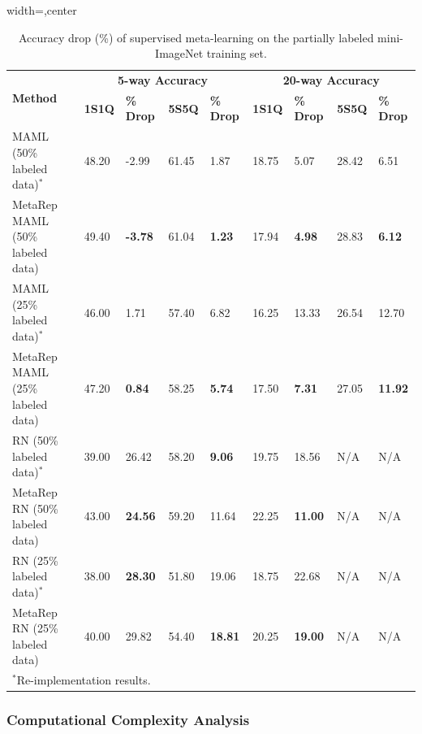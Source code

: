   
\begin{table}[htbp]
    \caption{Accuracy drop (\%) of supervised meta-learning on the partially labeled mini-ImageNet training set.}
    \begin{adjustbox}{width=\linewidth,center}
      \fontsize{9}{9}\selectfont
      \begin{tabular}{p{5cm}llll|llll}
        \toprule
        \multirow{2}{5cm}{\bf Method} 
        & \multicolumn{4}{c|}{\bf 5-way Accuracy} 
        & \multicolumn{4}{c}{\bf 20-way Accuracy} \\
        & {\bf 1S1Q} & {\bf \% Drop} & {\bf 5S5Q} & {\bf \% Drop} 
        & {\bf 1S1Q} & {\bf \% Drop} & {\bf 5S5Q} & {\bf \% Drop} \\
        \midrule
        MAML (50\% labeled data)$^{*}$          & 48.20 & -2.99 & 61.45 & 1.87  & 18.75 & 5.07  & 28.42 & 6.51  \\
        MetaRep MAML (50\% labeled data)        & 49.40 & \textbf{-3.78} & 61.04 & \textbf{1.23}  & 17.94 & \textbf{4.98} & 28.83 & \textbf{6.12} \\
        \midrule
        MAML (25\% labeled data)$^{*}$          & 46.00 & 1.71  & 57.40 & 6.82  & 16.25 & 13.33 & 26.54 & 12.70 \\
        MetaRep MAML (25\% labeled data)        & 47.20 & \textbf{0.84}  & 58.25 & \textbf{5.74}  & 17.50 & \textbf{7.31} & 27.05 & \textbf{11.92} \\
        \midrule
        RN (50\% labeled data)$^{*}$            & 39.00 & 26.42 & 58.20 & \textbf{9.06}   & 19.75 & 18.56 & N/A   & N/A   \\
        MetaRep RN (50\% labeled data)          & 43.00 & \textbf{24.56} & 59.20 & 11.64  & 22.25 & \textbf{11.00} & N/A   & N/A   \\
        \midrule
        RN (25\% labeled data)$^{*}$            & 38.00 & \textbf{28.30} & 51.80 & 19.06  & 18.75 & 22.68 & N/A   & N/A   \\
        MetaRep RN (25\% labeled data)          & 40.00 & 29.82 & 54.40 & \textbf{18.81} & 20.25 & \textbf{19.00} & N/A   & N/A   \\
        \bottomrule
        \multicolumn{9}{l}{$^{*}$Re-implementation results.}
      \end{tabular}
    \end{adjustbox}
    \label{tab:partially_label}
  \end{table}
  
\subsubsection{Computational Complexity Analysis}

